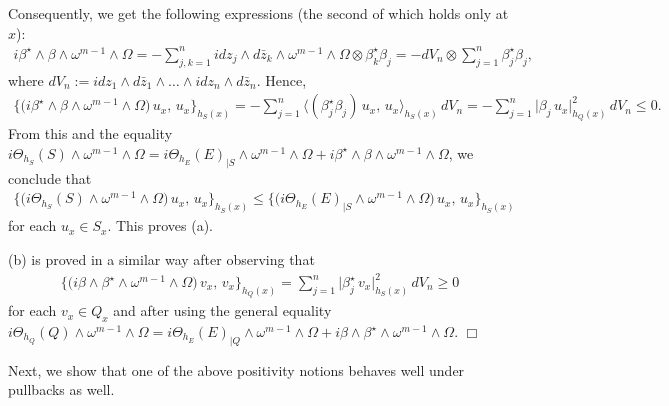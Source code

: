 \documentclass[12pt]{article}
\begin{document}
Consequently, we get the following expressions (the second of which holds only at $x$): \begin{eqnarray*}i\beta^\star\wedge\beta\wedge\omega^{m-1}\wedge\Omega = -\sum\limits_{j,k=1}^n idz_j\wedge d\bar{z}_k\wedge\omega^{m-1}\wedge\Omega\otimes\beta_k^\star\beta_j = - dV_n\otimes\sum_{j=1}^n\beta_j^\star\beta_j,\end{eqnarray*} where $dV_n:= idz_1\wedge d\bar{z}_1\wedge\dots\wedge idz_n\wedge d\bar{z}_n$. Hence, \begin{eqnarray*}\bigg\{\bigg(i\beta^\star\wedge\beta\wedge\omega^{m-1}\wedge\Omega\bigg)\,u_x,\,u_x\bigg\}_{h_S(x)} = -\sum_{j=1}^n\bigg\langle(\beta_j^\star\beta_j)\,u_x,\,u_x\bigg\rangle_{h_S(x)}\,dV_n = -\sum_{j=1}^n\bigg|\beta_j\,u_x\bigg|^2_{h_Q(x)}\,dV_n \leq 0.\end{eqnarray*} From this and the equality $i\Theta_{h_S}(S)\wedge\omega^{m-1}\wedge\Omega = i\Theta_{h_E}(E)_{|S}\wedge\omega^{m-1}\wedge\Omega + i\beta^\star\wedge\beta\wedge\omega^{m-1}\wedge\Omega$, we conclude that \begin{eqnarray*}\bigg\{\bigg(i\Theta_{h_S}(S)\wedge\omega^{m-1}\wedge\Omega\bigg)\,u_x,\,u_x\bigg\}_{h_S(x)}\leq \bigg\{\bigg(i\Theta_{h_E}(E)_{|S}\wedge\omega^{m-1}\wedge\Omega\bigg)\,u_x,\,u_x\bigg\}_{h_S(x)}\end{eqnarray*}  for each $u_x\in S_x$. This proves (a).

(b) is proved in a similar way after observing that \begin{eqnarray*}\bigg\{\bigg(i\beta\wedge\beta^\star\wedge\omega^{m-1}\wedge\Omega\bigg)\,v_x,\,v_x\bigg\}_{h_Q(x)} = \sum_{j=1}^n\bigg|\beta_j^\star\,v_x\bigg|^2_{h_S(x)}\,dV_n \geq 0\end{eqnarray*} for each $v_x\in Q_x$ and after using the general equality $i\Theta_{h_Q}(Q)\wedge\omega^{m-1}\wedge\Omega = i\Theta_{h_E}(E)_{|Q}\wedge\omega^{m-1}\wedge\Omega + i\beta\wedge\beta^\star\wedge\omega^{m-1}\wedge\Omega$.  \hfill $\Box$


\vspace{2ex}

Next, we show that one of the above positivity notions behaves well under pullbacks as well.
\end{document}
